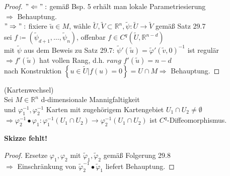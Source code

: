 \begin{proof}
$"\Leftarrow":$ gemäß Bsp. 5 erhält man lokale Parametriesierung \\
$\Rightarrow$ Behauptung. \\
$"\Rightarrow":$ fixiere $\tilde{u} \in M$, 
wähle $\tilde{U}, \tilde{V} \subset \mathbb{R}^n, 
\tilde{\psi}: \tilde{U} \rightarrow \tilde{V} $ gemäß Satz 29.7 \\
sei $f \coloneqq \left( \tilde{\psi}_{d+1}, \ldots , \tilde{\psi}_n \right)$,
offenbar $f \in C^q \left(  \tilde{U}, \mathbb{R}^{n-d} \right) $ \\
mit $\tilde{\psi}$ aus dem Beweis zu Satz 29.7:
$\tilde{\psi}' (\tilde{u}) = \tilde{\varphi}' (\tilde{v}, 0)^{-1} $ ist regulär \\
$\Rightarrow f'(\tilde{u}) $ hat vollen Rang, d.h. $\textit{rang } f'(\tilde{u}) = n-d $ \\
nach Konstruktion $ \left\lbrace u \in \tilde{U} | f(u) = 0 \right\rbrace = U \cap M
\Rightarrow $ Behauptung.
\end{proof}

\begin{lem}
(Kartenwechsel) \\
Sei $M \in \mathbb{R}^n $ d-dimensionale Mannigfaltigkeit \\
und $\varphi_1^{-1}, \varphi_2^{-1} $ Karten mit zugehörigem Kartengebiet 
$U_1 \cap U_2 \neq \emptyset $ \\
$\Longrightarrow 
\varphi_2^{-1} \bullet \varphi_1 : \varphi_1^{-1} \left( U_1 \cap U_2 \right)
\rightarrow \varphi_2^{-1} \left( U_1 \cap U_2 \right) $ ist $C^q$-Diffeomorphismus.

\textbf{Skizze fehlt!}
\end{lem}

\begin{proof}
Ersetze $\varphi_1, \varphi_2 $ mit $\tilde{\varphi}_1, \tilde{\varphi}_2 $
gemäß Folgerung 29.8 \\
$\Rightarrow$ Einschränkung von $\tilde{\varphi}_2^{-1} \bullet \tilde{\varphi}_1 $
liefert Behauptung. 
\end{proof}
